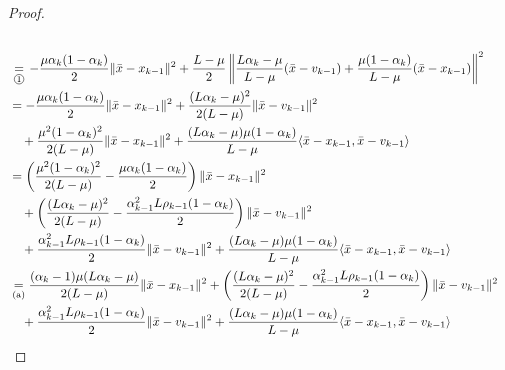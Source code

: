 \documentclass[12pt]{article}
\begin{document}
\begin{proof}
{\begin{align*}
                \\
                &\underset{\text{\circled{1}}}{=} 
                -\frac{\mu\alpha_k(1 - \alpha_k)}{2}\Vert \bar x - x_{k - 1}\Vert^2
                + \frac{L - \mu}{2}
                \left\Vert 
                    \frac{L\alpha_k - \mu}{L - \mu}(\bar x - v_{k - 1}) + 
                    \frac{\mu(1 - \alpha_k)}{L - \mu}(\bar x - x_{k - 1})
                \right\Vert^2
                \\
                &= 
                - \frac{\mu\alpha_k(1 - \alpha_k)}{2}\Vert \bar x - x_{k - 1}\Vert^2
                + \frac{(L\alpha_k - \mu)^2}{2(L - \mu)} \Vert \bar x - v_{k - 1}\Vert^2
                \\
                &\quad
                    + \frac{\mu^2(1 - \alpha_k)^2}{2(L - \mu)} \Vert \bar x - x_{k - 1}\Vert^2
                    + \frac{(L\alpha_k - \mu)\mu(1 - \alpha_k)}{L - \mu}\langle \bar x - x_{k - 1}, \bar x - v_{k - 1}\rangle
                \\
                &= \left(
                    \frac{\mu^2(1 - \alpha_k)^2}{2(L - \mu)} - \frac{\mu\alpha_k(1 - \alpha_k)}{2}
                \right)\Vert \bar x - x_{k - 1}\Vert^2
                    \\ &\quad 
                    + 
                    \left(
                        \frac{(L\alpha_k - \mu)^2}{2(L - \mu)}
                        - \frac{\alpha_{k - 1}^2L \rho_{k - 1}(1 - \alpha_k)}{2}
                    \right)\Vert \bar x - v_{k - 1}\Vert^2
                    \\ &\quad 
                    + \frac{\alpha_{k - 1}^2L \rho_{k - 1}(1 - \alpha_k)}{2}\Vert \bar x - v_{k - 1}\Vert^2
                    + \frac{(L\alpha_k - \mu)\mu(1 - \alpha_k)}{L - \mu}\langle \bar x - x_{k - 1}, \bar x - v_{k - 1}\rangle
                \\
                &\underset{\text{(a)}}{=} 
                \frac{(\alpha_k - 1)\mu(L\alpha_k - \mu)}{2(L - \mu)}\Vert \bar x - x_{k - 1}\Vert^2
                + 
                \left(
                    \frac{(L\alpha_k - \mu)^2}{2(L - \mu)}
                    - \frac{\alpha_{k - 1}^2L \rho_{k - 1}(1 - \alpha_k)}{2}
                \right)\Vert \bar x - v_{k - 1}\Vert^2
                \\ &\quad 
                    + \frac{\alpha_{k - 1}^2L \rho_{k - 1}(1 - \alpha_k)}{2}\Vert \bar x - v_{k - 1}\Vert^2
                    + \frac{(L\alpha_k - \mu)\mu(1 - \alpha_k)}{L - \mu}\langle \bar x - x_{k - 1}, \bar x - v_{k - 1}\rangle
                \\

\end{align*}}
\end{proof}
\end{document}
